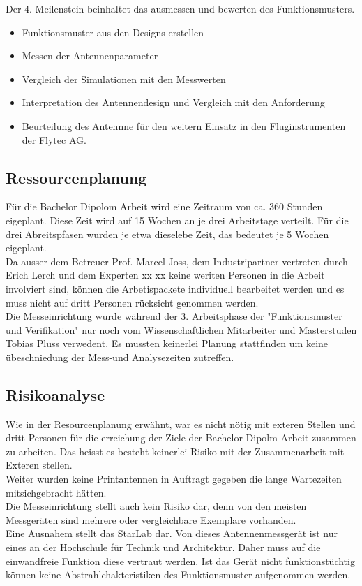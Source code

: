 Der 4. Meilenstein beinhaltet das ausmessen und bewerten des Funktionsmusters.
\begin{itemize}
\item Funktionsmuster aus den Designs erstellen
\item Messen der Antennenparameter
\item Vergleich der Simulationen mit den Messwerten
\item Interpretation des Antennendesign und Vergleich mit den Anforderung 
\item Beurteilung des Antennne für den weitern Einsatz in den Fluginstrumenten der Flytec AG. 
\end{itemize}

\subsection{Ressourcenplanung}
Für die Bachelor Dipolom Arbeit wird eine Zeitraum von ca. 360 Stunden eigeplant. Diese Zeit wird auf 15 Wochen an je drei Arbeitstage verteilt. Für die drei Abreitspfasen wurden je etwa dieselebe Zeit, das bedeutet je 5 Wochen eigeplant.\\
Da ausser dem Betreuer Prof. Marcel Joss, dem Industripartner vertreten durch Erich Lerch  und dem Experten xx xx keine weriten Personen in die Arbeit involviert sind, können die Arbetispackete individuell bearbeitet werden und es muss nicht auf dritt Personen rücksicht genommen werden.\\
Die Messeinrichtung wurde während der 3. Arbeitsphase der "Funktionsmuster und Verifikation" nur noch vom Wissenschaftlichen Mitarbeiter und Masterstuden Tobias Pluss verwedent. Es mussten keinerlei Planung stattfinden um keine übeschniedung der Mess-und Analysezeiten zutreffen. 

\subsection{Risikoanalyse}
Wie in der Resourcenplanung erwähnt, war es nicht nötig mit exteren Stellen und dritt Personen für die erreichung der Ziele der Bachelor Dipolm Arbeit zusammen zu arbeiten. Das heisst es besteht keinerlei Risiko mit der Zusammenarbeit mit Exteren stellen.\\
Weiter wurden keine Printantennen in Auftragt gegeben die lange Wartezeiten mitsichgebracht hätten.\\
Die Messeinrichtung stellt auch kein Risiko dar, denn von den meisten Messgeräten sind mehrere oder vergleichbare Exemplare vorhanden.\\
Eine Ausnahem stellt das StarLab dar. Von dieses Antennenmessgerät ist nur eines an der Hochschule für Technik und Architektur. Daher muss auf die einwandfreie Funktion diese vertraut werden. Ist das Gerät nicht funktionstüchtig können keine Abstrahlchakteristiken des Funktionsmuster aufgenommen werden.
